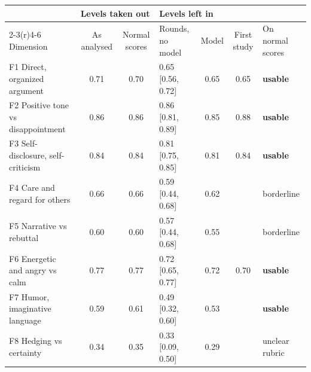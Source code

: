 {\scriptsize\setlength{\tabcolsep}{3.4pt}
\begin{tabular}{@{}l cc l cc l@{}}
\toprule
 & \multicolumn{2}{l}{Levels taken out} & \multicolumn{3}{l}{Levels left in} & \\
\cmidrule(r){2-3}\cmidrule(r){4-6}
Dimension & As analysed & Normal scores & Rounds, no model & Model & First study & On normal scores \\
\midrule
F1 Direct, organized argument & 0.71 & 0.70 & 0.65 {\scriptsize[0.56, 0.72]} & 0.65 & 0.65 & \textbf{usable} \\
F2 Positive tone vs disappointment & 0.86 & 0.86 & 0.86 {\scriptsize[0.81, 0.89]} & 0.85 & 0.88 & \textbf{usable} \\
F3 Self-disclosure, self-criticism & 0.84 & 0.84 & 0.81 {\scriptsize[0.75, 0.85]} & 0.81 & 0.84 & \textbf{usable} \\
F4 Care and regard for others & 0.66 & 0.66 & 0.59 {\scriptsize[0.44, 0.68]} & 0.62 &  & borderline \\
F5 Narrative vs rebuttal & 0.60 & 0.60 & 0.57 {\scriptsize[0.44, 0.68]} & 0.55 &  & borderline \\
F6 Energetic and angry vs calm & 0.77 & 0.77 & 0.72 {\scriptsize[0.65, 0.77]} & 0.72 & 0.70 & \textbf{usable} \\
F7 Humor, imaginative language & 0.59 & 0.61 & 0.49 {\scriptsize[0.32, 0.60]} & 0.53 &  & \textbf{usable} \\
F8 Hedging vs certainty & 0.34 & 0.35 & 0.33 {\scriptsize[0.09, 0.50]} & 0.29 &  & unclear rubric \\
\bottomrule
\end{tabular}}
